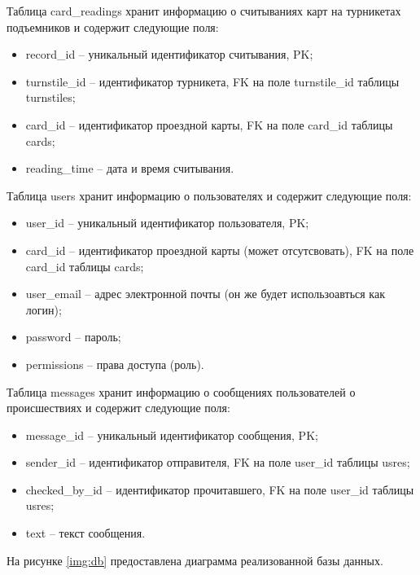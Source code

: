 Таблица card\_readings хранит информацию о считываниях карт на турникетах подъемников и содержит следующие поля:
\begin{itemize}
	\item record\_id -- уникальный идентификатор считывания, PK;
	\item turnstile\_id -- идентификатор турникета, FK на поле turnstile\_id таблицы turnstiles;
	\item card\_id -- идентификатор проездной карты, FK на поле card\_id таблицы cards;
	\item reading\_time -- дата и время считывания.
\end{itemize}


Таблица users хранит информацию о пользователях и содержит следующие поля:
\begin{itemize}
	\item user\_id -- уникальный идентификатор пользователя, PK;
	\item card\_id -- идентификатор проездной карты (может отсутсвовать), FK на поле card\_id таблицы cards;
	\item user\_email -- адрес электронной почты (он же будет использоавться как логин);
	\item password -- пароль;
	\item permissions -- права доступа (роль).
\end{itemize}


Таблица messages хранит информацию о сообщениях пользователей о происшествиях и содержит следующие поля:
\begin{itemize}
	\item message\_id -- уникальный идентификатор сообщения, PK;
	\item sender\_id -- идентификатор отправителя, FK на поле user\_id таблицы usres;
	\item checked\_by\_id -- идентификатор прочитавшего, FK на поле user\_id таблицы usres;
	\item text -- текст сообщения.	
\end{itemize}



На рисунке \ref{img:db} предоставлена диаграмма реализованной базы данных.



